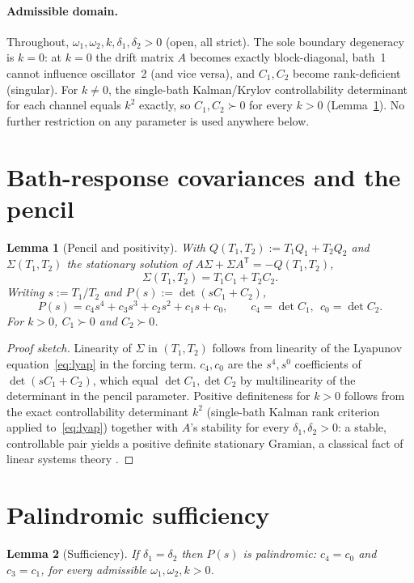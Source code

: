 \documentclass[11pt]{article}
\newtheorem{lemma}{Lemma}
\theoremstyle{definition}
\begin{document}
\paragraph{Admissible domain.} Throughout, $\omega_1,\omega_2,k,\delta_1,
\delta_2>0$ (open, all strict). The sole boundary degeneracy is $k=0$: at
$k=0$ the drift matrix $A$ becomes exactly block-diagonal, bath~1 cannot
influence oscillator~2 (and vice versa), and $C_1,C_2$ become rank-deficient
(singular). For $k\neq0$, the single-bath Kalman/Krylov controllability
determinant for each channel equals $k^2$ exactly, so $C_1,C_2\succ0$ for
every $k>0$ (Lemma~\ref{lem:pencil}). No further restriction on any
parameter is used anywhere below.

\section{Bath-response covariances and the pencil}
\label{sec:pencil}

\begin{lemma}[Pencil and positivity]
\label{lem:pencil}
With $Q(T_1,T_2):=T_1Q_1+T_2Q_2$ and $\Sigma(T_1,T_2)$ the stationary
solution of $A\Sigma+\Sigma A^{\mathsf T}=-Q(T_1,T_2)$,
\[
\Sigma(T_1,T_2) = T_1 C_1 + T_2 C_2.
\]
Writing $s:=T_1/T_2$ and $P(s):=\det(sC_1+C_2)$,
\[
P(s) = c_4 s^4+c_3s^3+c_2s^2+c_1s+c_0, \qquad c_4=\det C_1,\ \ c_0=\det C_2.
\]
For $k>0$, $C_1\succ0$ and $C_2\succ0$.
\end{lemma}

\begin{proof}[Proof sketch]
Linearity of $\Sigma$ in $(T_1,T_2)$ follows from linearity of the
Lyapunov equation~\eqref{eq:lyap} in the forcing term. $c_4,c_0$ are the
$s^4,s^0$ coefficients of $\det(sC_1+C_2)$, which equal $\det C_1,\det
C_2$ by multilinearity of the determinant in the pencil parameter.
Positive definiteness for $k>0$ follows from the exact controllability
determinant $k^2$ (single-bath Kalman rank criterion applied
to~\eqref{eq:lyap}) together with $A$'s stability for every
$\delta_1,\delta_2>0$: a stable, controllable pair yields a positive
definite stationary Gramian, a classical fact of linear systems theory
\cite{kailath1980}.
\end{proof}

\section{Palindromic sufficiency}
\label{sec:sufficiency}

\begin{lemma}[Sufficiency]
\label{lem:sufficiency}
If $\delta_1=\delta_2$ then $P(s)$ is palindromic: $c_4=c_0$ and
$c_3=c_1$, for every admissible $\omega_1,\omega_2,k>0$.
\end{lemma}
\end{document}
